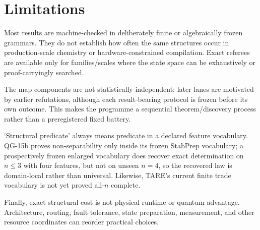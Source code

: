 \section{Limitations}

Most results are machine-checked in deliberately finite or algebraically frozen grammars. They do not establish how often the same structures occur in production-scale chemistry or hardware-constrained compilation. Exact referees are available only for families/scales where the state space can be exhaustively or proof-carryingly searched.

The map components are not statistically independent: later lanes are motivated by earlier refutations, although each result-bearing protocol is frozen before its own outcome. This makes the programme a sequential theorem/discovery process rather than a preregistered fixed battery.

`Structural predicate' always means predicate in a declared feature vocabulary. QG-15b proves non-separability only inside its frozen StabPrep vocabulary; a prospectively frozen enlarged vocabulary does recover exact determination on $n\le3$ with four features, but not on unseen $n=4$, so the recovered law is domain-local rather than universal. Likewise, TARE's current finite trade vocabulary is not yet proved all-$n$ complete.

Finally, exact structural cost is not physical runtime or quantum advantage. Architecture, routing, fault tolerance, state preparation, measurement, and other resource coordinates can reorder practical choices.